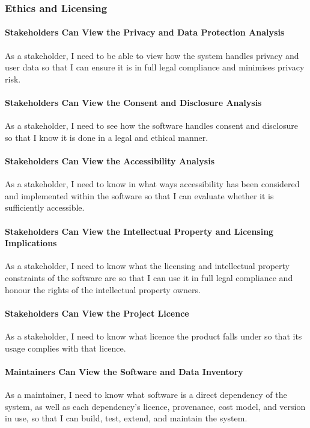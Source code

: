 \subsubsection{Ethics and Licensing}

\paragraph{Stakeholders Can View the Privacy and Data Protection Analysis}
As a stakeholder, I need to be able to view how the system handles privacy and user data so that I can ensure it is in full legal compliance and minimises privacy risk.

\paragraph{Stakeholders Can View the Consent and Disclosure Analysis}
As a stakeholder, I need to see how the software handles consent and disclosure so that I know it is done in a legal and ethical manner.

\paragraph{Stakeholders Can View the Accessibility Analysis}
As a stakeholder, I need to know in what ways accessibility has been considered and implemented within the software so that I can evaluate whether it is sufficiently accessible.

\paragraph{Stakeholders Can View the Intellectual Property and Licensing Implications}
As a stakeholder, I need to know what the licensing and intellectual property constraints of the software are so that I can use it in full legal compliance and honour the rights of the intellectual property owners.

\paragraph{Stakeholders Can View the Project Licence}
As a stakeholder, I need to know what licence the product falls under so that its usage complies with that licence.

\paragraph{Maintainers Can View the Software and Data Inventory}
As a maintainer, I need to know what software is a direct dependency of the system, as well as each dependency's licence, provenance, cost model, and version in use, so that I can build, test, extend, and maintain the system.

